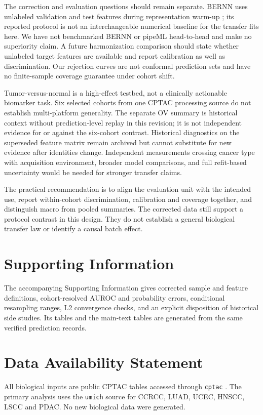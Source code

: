 The correction and evaluation questions should remain separate.
BERNN uses unlabeled validation and test features during representation
warm-up \citep{PelletierBERNN}; its reported protocol is not an
interchangeable numerical baseline for the transfer fits here. We have
not benchmarked BERNN or pipeML \citep{HurtadoPipeML} head-to-head and
make no superiority claim. A future harmonization comparison should
state whether unlabeled target features are available and report
calibration as well as discrimination. Our rejection curves are not
conformal prediction sets and have no finite-sample coverage guarantee
under cohort shift.

Tumor-versus-normal is a high-effect testbed, not a clinically actionable
biomarker task. Six selected cohorts from one CPTAC processing source
do not establish multi-platform generality. The separate OV summary is
historical context without prediction-level replay in this revision;
it is not independent evidence for or against the six-cohort contrast.
Historical diagnostics on the superseded feature matrix remain
archived but cannot substitute for new evidence after identities change.
Independent measurements crossing cancer type with acquisition
environment, broader model comparisons, and full refit-based uncertainty
would be needed for stronger transfer claims.

The practical recommendation is to align the evaluation unit with the
intended use, report within-cohort discrimination, calibration and
coverage together, and distinguish macro from pooled summaries.
The corrected data still support a protocol contrast in this design.
They do not establish a general biological transfer law or identify a
causal batch effect.

\section{Supporting Information}
The accompanying Supporting Information gives corrected sample and
feature definitions, cohort-resolved AUROC and probability errors,
conditional resampling ranges, L2 convergence checks, and an explicit
disposition of historical side studies. Its tables and the main-text
tables are generated from the same verified prediction records.

\section{Data Availability Statement}
All biological inputs are public CPTAC tables accessed through
\texttt{cptac} \citep{cptacPkg}. The primary analysis uses the
\texttt{umich} source for CCRCC, LUAD, UCEC, HNSCC, LSCC and PDAC.
No new biological data were generated.

